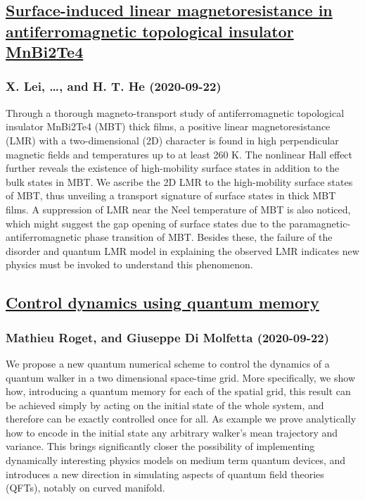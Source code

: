 {\subsection*{\href{http://arxiv.org/abs/2009.10412v1}{Surface-induced linear magnetoresistance in antiferromagnetic  topological insulator MnBi2Te4}}
\subsubsection*{X. Lei, \dots, and H. T. He (2020-09-22)}
Through a thorough magneto-transport study of antiferromagnetic topological
insulator MnBi2Te4 (MBT) thick films, a positive linear magnetoresistance (LMR)
with a two-dimensional (2D) character is found in high perpendicular magnetic
fields and temperatures up to at least 260 K. The nonlinear Hall effect further
reveals the existence of high-mobility surface states in addition to the bulk
states in MBT. We ascribe the 2D LMR to the high-mobility surface states of
MBT, thus unveiling a transport signature of surface states in thick MBT films.
A suppression of LMR near the Neel temperature of MBT is also noticed, which
might suggest the gap opening of surface states due to the
paramagnetic-antiferromagnetic phase transition of MBT. Besides these, the
failure of the disorder and quantum LMR model in explaining the observed LMR
indicates new physics must be invoked to understand this phenomenon.

\subsection*{\href{http://arxiv.org/abs/2009.10408v1}{Control dynamics using quantum memory}}
\subsubsection*{Mathieu Roget, and Giuseppe Di Molfetta (2020-09-22)}
We propose a new quantum numerical scheme to control the dynamics of a
quantum walker in a two dimensional space-time grid. More specifically, we show
how, introducing a quantum memory for each of the spatial grid, this result can
be achieved simply by acting on the initial state of the whole system, and
therefore can be exactly controlled once for all. As example we prove
analytically how to encode in the initial state any arbitrary walker's mean
trajectory and variance. This brings significantly closer the possibility of
implementing dynamically interesting physics models on medium term quantum
devices, and introduces a new direction in simulating aspects of quantum field
theories (QFTs), notably on curved manifold.

}
